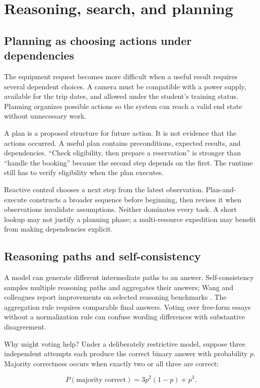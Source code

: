 \chapter{Reasoning, search, and planning}
\section{Planning as choosing actions under dependencies}
The equipment request becomes more difficult when a useful result requires several dependent choices. A camera must be compatible with a power supply, available for the trip dates, and allowed under the student's training status. Planning organizes possible actions so the system can reach a valid end state without unnecessary work.

A plan is a proposed structure for future action. It is not evidence that the actions occurred. A useful plan contains preconditions, expected results, and dependencies. “Check eligibility, then prepare a reservation” is stronger than “handle the booking” because the second step depends on the first. The runtime still has to verify eligibility when the plan executes.

Reactive control chooses a next step from the latest observation. Plan-and-execute constructs a broader sequence before beginning, then revises it when observations invalidate assumptions. Neither dominates every task. A short lookup may not justify a planning phase; a multi-resource expedition may benefit from making dependencies explicit.

\section{Reasoning paths and self-consistency}
A model can generate different intermediate paths to an answer. Self-consistency samples multiple reasoning paths and aggregates their answers; Wang and colleagues report improvements on selected reasoning benchmarks \cite{self-consistency}. The aggregation rule requires comparable final answers. Voting over free-form essays without a normalization rule can confuse wording differences with substantive disagreement.

Why might voting help? Under a deliberately restrictive model, suppose three independent attempts each produce the correct binary answer with probability \(p\). Majority correctness occurs when exactly two or all three are correct:

\begin{equation}
P(\text{majority correct})=3p^2(1-p)+p^3.
\end{equation}

